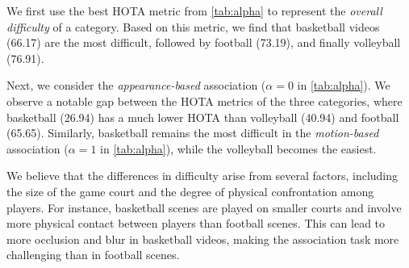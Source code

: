 \documentclass[10pt,twocolumn,letterpaper]{article}
\begin{document}
We first use the best HOTA metric from \cref{tab:alpha} to represent the \textit{overall difficulty} of a category. Based on this metric, we find that basketball videos (66.17) are the most difficult, followed by football (73.19), and finally volleyball (76.91).

Next, we consider the \textit{appearance-based} association (\ie $\alpha=0$ in \cref{tab:alpha}). We observe a notable gap between the HOTA metrics of the three categories, where basketball (26.94) has a much lower HOTA than volleyball (40.94) and football (65.65). Similarly, basketball remains the most difficult in the \textit{motion-based} association (\ie $\alpha=1$ in \cref{tab:alpha}), while the volleyball becomes the easiest.

We believe that the differences in difficulty arise from several factors, including the size of the game court and the degree of physical confrontation among players. For instance, basketball scenes are played on smaller courts and involve more physical contact between players than football scenes. This can lead to more occlusion and blur in basketball videos, making the association task more challenging than in football scenes.

\begin{table}[pt]
\vspace{-3mm}
\caption{Results of the ablation experiment on SportsMOT test set. IoU means computing IoU between detections and the last location of existing tracks for association, while Motion means using Kalman filter to predict the location of tracks. The models are trained on SportsMOT training and validation set.}
\vspace{-6mm}
\label{fig:ablation}
\end{table}
\end{document}
